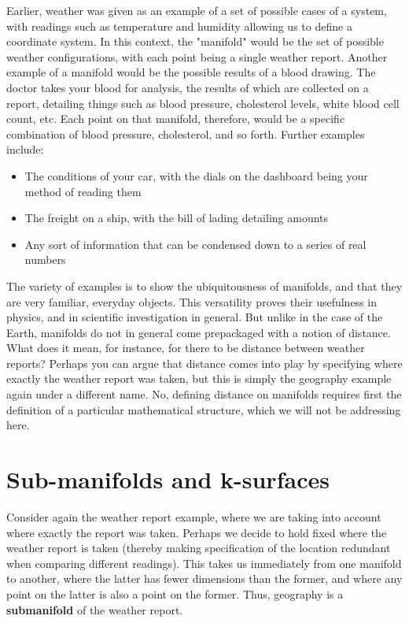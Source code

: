 \documentclass{book}
\begin{document}
Earlier, weather was given as an example of a set of possible cases of a system, with readings such as temperature and humidity allowing us to define a coordinate system. In this context, the "manifold" would be the set of possible weather configurations, with each point being a single weather report. Another example of a manifold would be the possible results of a blood drawing. The doctor takes your blood for analysis, the results of which are collected on a report, detailing things such as blood pressure, cholesterol levels, white blood cell count, etc. Each point on that manifold, therefore, would be a specific combination of blood pressure, cholesterol, and so forth. Further examples include: 

\begin{itemize}
\item The conditions of your car, with the dials on the dashboard being your method of reading them 

\item The freight on a ship, with the bill of lading detailing amounts

\item Any sort of information that can be condensed down to a series of real numbers

\end{itemize}

The variety of examples is to show the ubiquitousness of manifolds, and that they are very familiar, everyday objects. This versatility proves their usefulness in physics, and in scientific investigation in general. But unlike in the case of the Earth, manifolds do not in general come prepackaged with a notion of distance. What does it mean, for instance, for there to be distance between weather reports? Perhaps you can argue that distance comes into play by specifying where exactly the weather report was taken, but this is simply the geography example again under a different name. No, defining distance on manifolds requires first the definition of a particular mathematical structure, which we will not be addressing here. 




\section{Sub-manifolds and k-surfaces}

Consider again the weather report example, where we are taking into account where exactly the report was taken. Perhaps we decide to hold fixed where the weather report is taken (thereby making specification of the location redundant when comparing different readings). This takes us immediately from one manifold to another, where the latter has fewer dimensions than the former, and where any point on the latter is also a point on the former. Thus, geography is a \textbf{submanifold} of the weather report.
\end{document}
